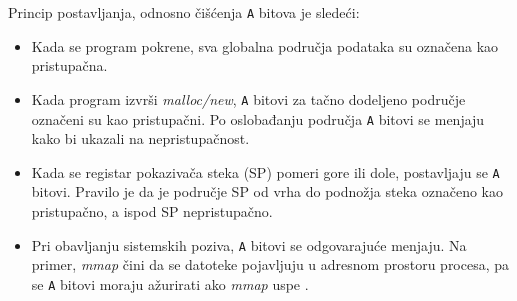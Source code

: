 \documentclass[12pt,oneside]{memoir}
\theoremstyle{plain}
\theoremstyle{definition}
\begin{document}
Princip postavljanja, odnosno čišćenja \texttt{A} bitova je sledeći:
\begin{itemize}
\item Kada se program pokrene, sva globalna područja podataka su označena kao pristupačna.
\item Kada program izvrši \textit{malloc/new}, \texttt{A} bitovi za tačno dodeljeno područje označeni su kao pristupačni. Po oslobađanju područja \texttt{A} bitovi se menjaju kako bi ukazali na nepristupačnost.
\item Kada se registar pokazivača steka (SP) pomeri gore ili dole, postavljaju se \texttt{A} bitovi. Pravilo je da je područje SP od vrha do podnožja steka označeno kao pristupačno, a ispod SP nepristupačno. 
\item Pri obavljanju sistemskih poziva, \texttt{A} bitovi se odgovarajuće menjaju. Na primer, \textit{mmap} čini da se datoteke pojavljuju u adresnom prostoru procesa, pa se \texttt{A} bitovi moraju ažurirati ako \textit{mmap} uspe \cite{Memcheck}. 
\end{itemize}
\end{document}
